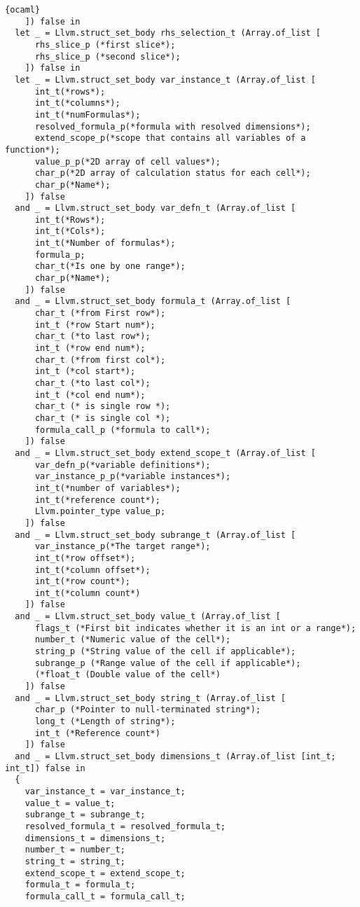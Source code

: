 \begin{lstlisting}{ocaml}
    ]) false in
  let _ = Llvm.struct_set_body rhs_selection_t (Array.of_list [
      rhs_slice_p (*first slice*);
      rhs_slice_p (*second slice*);
    ]) false in
  let _ = Llvm.struct_set_body var_instance_t (Array.of_list [
      int_t(*rows*);
      int_t(*columns*);
      int_t(*numFormulas*);
      resolved_formula_p(*formula with resolved dimensions*);
      extend_scope_p(*scope that contains all variables of a function*);
      value_p_p(*2D array of cell values*);
      char_p(*2D array of calculation status for each cell*);
      char_p(*Name*);
    ]) false
  and _ = Llvm.struct_set_body var_defn_t (Array.of_list [
      int_t(*Rows*);
      int_t(*Cols*);
      int_t(*Number of formulas*);
      formula_p;
      char_t(*Is one by one range*);
      char_p(*Name*);
    ]) false
  and _ = Llvm.struct_set_body formula_t (Array.of_list [
      char_t (*from First row*);
      int_t (*row Start num*);
      char_t (*to last row*);
      int_t (*row end num*);
      char_t (*from first col*);
      int_t (*col start*);
      char_t (*to last col*);
      int_t (*col end num*);
      char_t (* is single row *);
      char_t (* is single col *);
      formula_call_p (*formula to call*);
    ]) false
  and _ = Llvm.struct_set_body extend_scope_t (Array.of_list [
      var_defn_p(*variable definitions*);
      var_instance_p_p(*variable instances*);
      int_t(*number of variables*);
      int_t(*reference count*);
      Llvm.pointer_type value_p;
    ]) false
  and _ = Llvm.struct_set_body subrange_t (Array.of_list [
      var_instance_p(*The target range*);
      int_t(*row offset*);
      int_t(*column offset*);
      int_t(*row count*);
      int_t(*column count*)
    ]) false
  and _ = Llvm.struct_set_body value_t (Array.of_list [
      flags_t (*First bit indicates whether it is an int or a range*);
      number_t (*Numeric value of the cell*);
      string_p (*String value of the cell if applicable*);
      subrange_p (*Range value of the cell if applicable*);
      (*float_t (Double value of the cell*)
    ]) false
  and _ = Llvm.struct_set_body string_t (Array.of_list [
      char_p (*Pointer to null-terminated string*);
      long_t (*Length of string*);
      int_t (*Reference count*)
    ]) false
  and _ = Llvm.struct_set_body dimensions_t (Array.of_list [int_t; int_t]) false in
  {
    var_instance_t = var_instance_t;
    value_t = value_t;
    subrange_t = subrange_t;
    resolved_formula_t = resolved_formula_t;
    dimensions_t = dimensions_t;
    number_t = number_t;
    string_t = string_t;
    extend_scope_t = extend_scope_t;
    formula_t = formula_t;
    formula_call_t = formula_call_t;


\end{lstlisting}
